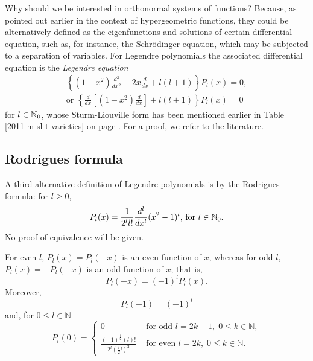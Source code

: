 Why should we be interested in orthonormal systems of functions?
Because, as pointed out earlier in the context of hypergeometric functions,
they could be alternatively defined as the eigenfunctions and solutions of certain differential equation,
such as, for instance, the Schr\"odinger equation, which may be subjected to a separation of variables.
For Legendre polynomials the associated differential equation is the  {\em Legendre equation}
\begin{equation}
\begin{split}
\left\{
(1-x^2) \frac{d^2}{dx^2}
- 2x  \frac{d}{dx} +l(l+1)
\right\}P_l(x) = 0,
\\
\textrm{or } \left\{  \frac{d }{dx }\left[\left(1-x^2\right)\frac{d }{dx }\right]
+
 l(l+1) \right\}  P_l(x)= 0
\end{split}
\label{2011-m-ch-sfelpede}
\end{equation}
for $l\in {\Bbb N}_0$,
whose Sturm-Liouville form has been mentioned earlier in Table \ref{2011-m-sl-t-varieties}
on page \pageref{2011-m-sl-t-varieties}.
For a proof, we refer to the literature.


\subsection{Rodrigues formula}

A third alternative definition  of Legendre polynomials
is by the  Rodrigues formula: for $l\ge 0$,
\begin{equation}
P_l(x)=\frac{1}{2^ll!}\frac{d^l}{dx^l}(x^2-1)^l \textrm{, for }l\in {\Bbb N}_0.
\label{2011-m-ch-sfrf}
\end{equation}
No proof of equivalence will be given.

For even $l$, $P_l(x)=P_l(-x)$ is an even function of $x$,
whereas
for odd $l$, $P_l(x)=-P_l(-x)$ is an odd function of $x$;
that is,
\begin{equation}
P_l(-x)=(-1)^lP_l(x).
\end{equation}
Moreover,
\begin{equation}
P_l(-1)=(-1)^l
\end{equation}
and, for $0 \le l \in {\mathbb N}$
\begin{equation}
P_l(0)
=\begin{cases}
0  &
\text{ for odd } l=2k+1, \; 0\le k\in {\mathbb N},   \\
\frac{(-1)^\frac{l}{2} (l)!}{2^{l} \left(\frac{l}{2}!\right)^2}  &
\text{ for even } l=2k, \; 0\le k\in {\mathbb N}.
\end{cases}
\label{2019-mm-ch-sf-lpaz}
\end{equation}




